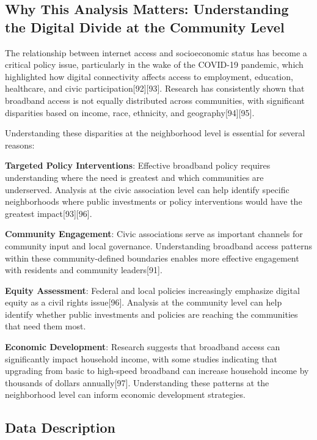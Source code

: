 \documentclass[
  letterpaper,
  DIV=11,
  numbers=noendperiod]{scrartcl}
\begin{document}
\subsection{Why This Analysis Matters: Understanding the Digital Divide
at the Community
Level}\label{why-this-analysis-matters-understanding-the-digital-divide-at-the-community-level}

The relationship between internet access and socioeconomic status has
become a critical policy issue, particularly in the wake of the COVID-19
pandemic, which highlighted how digital connectivity affects access to
employment, education, healthcare, and civic
participation{[}92{]}{[}93{]}. Research has consistently shown that
broadband access is not equally distributed across communities, with
significant disparities based on income, race, ethnicity, and
geography{[}94{]}{[}95{]}.

Understanding these disparities at the neighborhood level is essential
for several reasons:

\textbf{Targeted Policy Interventions}: Effective broadband policy
requires understanding where the need is greatest and which communities
are underserved. Analysis at the civic association level can help
identify specific neighborhoods where public investments or policy
interventions would have the greatest impact{[}93{]}{[}96{]}.

\textbf{Community Engagement}: Civic associations serve as important
channels for community input and local governance. Understanding
broadband access patterns within these community-defined boundaries
enables more effective engagement with residents and community
leaders{[}91{]}.

\textbf{Equity Assessment}: Federal and local policies increasingly
emphasize digital equity as a civil rights issue{[}96{]}. Analysis at
the community level can help identify whether public investments and
policies are reaching the communities that need them most.

\textbf{Economic Development}: Research suggests that broadband access
can significantly impact household income, with some studies indicating
that upgrading from basic to high-speed broadband can increase household
income by thousands of dollars annually{[}97{]}. Understanding these
patterns at the neighborhood level can inform economic development
strategies.

\subsection{Data Description}\label{data-description}
\end{document}

